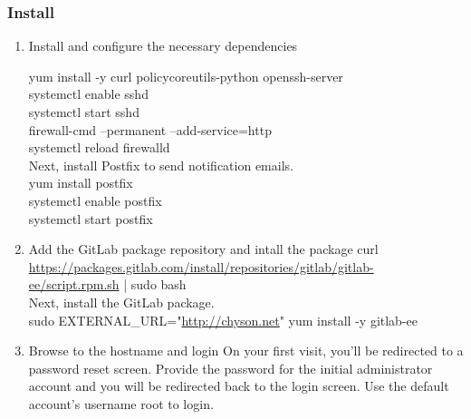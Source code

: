 \documentclass[11pt]{article}
\begin{document}
\subsubsection{Install}
\label{sec:org9d02813}
\begin{enumerate}
\item Install and configure the necessary dependencies
\label{sec:orgd3b197b}

yum install -y curl policycoreutils-python openssh-server\\
systemctl enable sshd\\
systemctl start sshd\\
firewall-cmd --permanent --add-service=http\\
systemctl reload firewalld\\

Next, install Postfix to send notification emails.\\
yum install postfix\\
systemctl enable postfix\\
systemctl start postfix\\

\item Add the GitLab package repository and intall the package
\label{sec:org48e34f8}
curl \url{https://packages.gitlab.com/install/repositories/gitlab/gitlab-ee/script.rpm.sh} | sudo bash\\

Next, install the GitLab package.\\

sudo EXTERNAL\_URL="\url{http://chyson.net}" yum install -y gitlab-ee\\

\item Browse to the hostname and login
\label{sec:orgd33a62b}
On your first visit, you'll be redirected to a password reset screen. Provide the password for the initial administrator account and you will be redirected back to the login screen. Use the default account's username root to login.\\
\end{enumerate}
\end{document}
